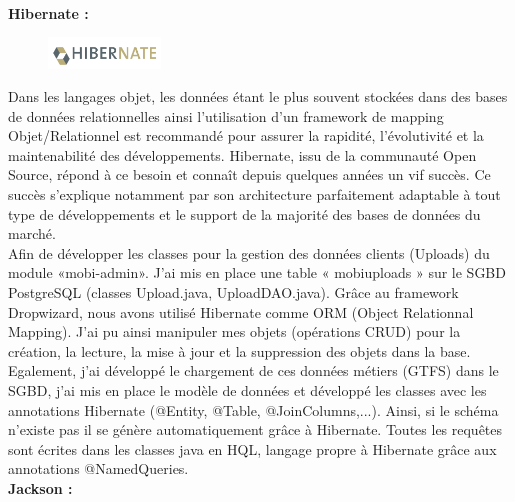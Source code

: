 \begin{itemize}
\\

\textbf{Hibernate :}

\begin{figure}
\centering
\includegraphics[width=3cm]{images/hibernate.png}
\end{figure}
\noindent Dans les langages objet, les données étant le plus souvent stockées dans des bases de données relationnelles ainsi l'utilisation d'un framework de mapping Objet/Relationnel est recommandé pour assurer la rapidité, l'évolutivité et la maintenabilité des développements. Hibernate, issu de la communauté Open Source, répond à ce besoin et connaît depuis quelques années un vif succès. Ce succès s'explique notamment par son architecture parfaitement adaptable à tout type de développements et le support de la majorité des bases de données du marché.\\

Afin de développer les classes pour la gestion des données clients (Uploads) du module «mobi-admin». J'ai mis en place une table « mobiuploads » sur le SGBD PostgreSQL (classes Upload.java, UploadDAO.java).
Grâce au framework Dropwizard, nous avons utilisé Hibernate comme ORM (Object Relationnal Mapping). J'ai pu ainsi manipuler mes objets (opérations CRUD) pour la création, la lecture, la mise à jour et la suppression des objets dans la base. 
Egalement, j'ai développé le chargement de ces données métiers (GTFS) dans le SGBD, j'ai mis en place le modèle de données et développé les classes avec les annotations Hibernate (@Entity, @Table, @JoinColumns,...). Ainsi, si le schéma n'existe pas il se génère automatiquement grâce à Hibernate. 
Toutes les requêtes sont écrites dans les classes java en HQL, langage propre à Hibernate grâce aux annotations @NamedQueries. \\


\textbf{Jackson :}


\end{itemize}
